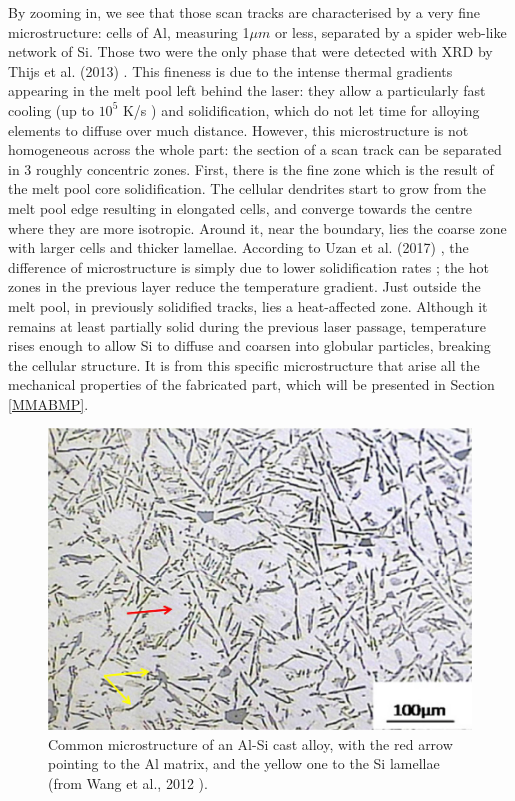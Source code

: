 By zooming in, we see that those scan tracks are characterised by a very fine microstructure: cells of Al, measuring 1$\mu m$ or less, separated by a spider web-like network of Si. Those two were the only phase that were detected with XRD by Thijs et al. (2013) \cite{Thijs13}. This fineness is due to the intense thermal gradients appearing in the melt pool left behind the laser: they allow a particularly fast cooling (up to $10^5$ K/s \cite{PRASHANTH14}) and solidification, which do not let time for alloying elements to diffuse over much distance. However, this microstructure is not homogeneous across the whole part: the section of a scan track can be separated in 3 roughly concentric zones. First, there is the fine zone which is the result of the melt pool core solidification. The cellular dendrites start to grow from the melt pool edge resulting in elongated  cells, and converge towards the centre where they are more isotropic. Around it, near the boundary, lies the coarse zone with larger cells and thicker lamellae. According to Uzan et al. (2017) \cite{UZAN2017229}, the difference of microstructure is simply due to lower solidification rates ; the hot zones in the previous layer reduce the temperature gradient. Just outside the melt pool, in previously solidified tracks, lies a heat-affected zone. Although it remains at least partially solid during the previous laser passage, temperature rises enough to allow Si to diffuse and coarsen into globular particles, breaking the cellular structure. It is from this specific microstructure that arise all the mechanical properties of the fabricated part, which will be presented in Section \ref{MMABMP}.\\

\begin{figure}[ht]
	\centering
	\includegraphics[scale=0.30]{Images/micro_cast}
	\decoRule
	\caption[Common microstructure of an Al-Si cast alloy]{Common microstructure of an Al-Si cast alloy, with the red arrow pointing to the Al matrix, and the yellow one to the Si lamellae (from Wang et al., 2012 \parencite{Wang12}).}
	\label{fig:micro_cast}
\end{figure}

